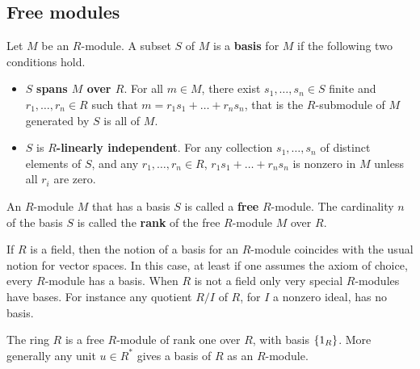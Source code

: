\pagebreak

\subsection{Free modules}

\begin{definition}
Let $ M $ be an $ R $-module. A subset $ S $ of $ M $ is a \textbf{basis} for $ M $ if the following two conditions hold.
\begin{itemize}
\item $ S $ \textbf{spans $ M $ over $ R $}. For all $ m \in M $, there exist $ s_1, \dots, s_n \in S $ finite and $ r_1, \dots, r_n \in R $ such that $ m = r_1s_1 + \dots + r_ns_n $, that is the $ R $-submodule of $ M $ generated by $ S $ is all of $ M $.
\item $ S $ is \textbf{$ R $-linearly independent}. For any collection $ s_1, \dots, s_n $ of distinct elements of $ S $, and any $ r_1, \dots, r_n \in R $, $ r_1s_1 + \dots + r_ns_n $ is nonzero in $ M $ unless all $ r_i $ are zero.
\end{itemize}
\end{definition}

\begin{definition}
An $ R $-module $ M $ that has a basis $ S $ is called a \textbf{free} $ R $-module. The cardinality $ n $ of the basis $ S $ is called the \textbf{rank} of the free $ R $-module $ M $ over $ R $.
\end{definition}


\begin{remark}
If $ R $ is a field, then the notion of a basis for an $ R $-module coincides with the usual notion for vector spaces. In this case, at least if one assumes the axiom of choice, every $ R $-module has a basis. When $ R $ is not a field only very special $ R $-modules have bases. For instance any quotient $ R / I $ of $ R $, for $ I $ a nonzero ideal, has no basis.
\end{remark}

\begin{example*}
The ring $ R $ is a free $ R $-module of rank one over $ R $, with basis $ \cbr{1_R} $. More generally any unit $ u \in R^* $ gives a basis of $ R $ as an $ R $-module.
\end{example*}

